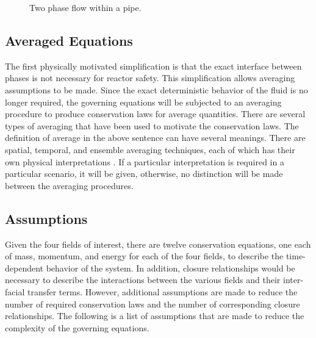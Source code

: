 \begin{figure}[ht]
\caption{Two phase flow within a pipe.}
\label{fig:pipe_with_bubbles}
\begin{center}
\end{center}
\end{figure}

\subsection{Averaged Equations}
\label{subsect:averaged_equations}
The first physically motivated simplification is that the exact interface between phases is not necessary for reactor safety.
This simplification allows averaging assumptions to be made.
Since the exact deterministic behavior of the fluid is no longer required, the governing equations will be subjected to an averaging procedure to produce conservation laws for average quantities.
There are several types of averaging that have been used to motivate the conservation laws.
The definition of average in the above sentence can have several meanings.
There are spatial, temporal, and ensemble averaging techniques, each of which has their own physical interpretations \cite{Drew1998, Todreas2011}.
If a particular interpretation is required in a particular scenario, it will be given, otherwise, no distinction will be made between the averaging procedures.

\subsection{Assumptions}
\label{subsect:assumptions}
Given the four fields of interest, there are twelve conservation equations, one each of mass, momentum, and energy for each of the four fields, to describe the time-dependent behavior of the system.
In addition, closure relationships would be necessary to describe the interactions between the various fields and their inter-facial transfer terms.
However, additional assumptions are made to reduce the number of required conservation laws and the number of corresponding closure relationships.
The following is a list of assumptions that are made to reduce the complexity of the governing equations.

